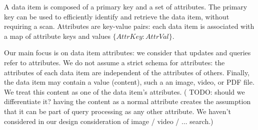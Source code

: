 A data item is composed of a primary key and a set of attributes.
The primary key can be used to efficiently identify and retrieve the data item, without requiring a scan.
Attributes are key-value pairs: each data item is associated with a map of attribute keys and values
$\{AttrKey: AttrVal\}$.

Our main focus is on data item attributes: we consider that updates and queries refer to attributes.
We do not assume a strict schema for attributes: the attributes of each data item are independent of the attributes of
others.
Finally, the data item may contain a value (content), such a an image, video, or PDF file.
We treat this content as one of the data item's attributes.
(
TODO: should we differentiate it? having the content as a normal attribute creates the assumption that it can be part of
query processing as any other attribute. We haven't considered in our design consideration of image / video / ... search.)

